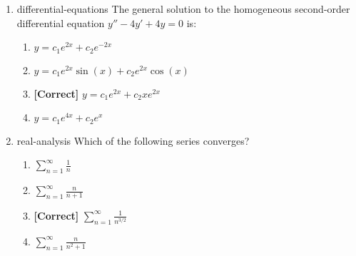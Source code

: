 \documentclass{article}
\newenvironment{problem}{\item}{}
\newcommand{\choice}{\item}
\newcommand{\correctchoice}{\item \textbf{[Correct] }}
\newcommand{\tags}[1]{#1} %
\begin{document}
\begin{enumerate}
        \begin{problem}
            \tags{differential-equations}
            The general solution to the homogeneous second-order differential equation $y'' - 4y' + 4y = 0$ is:
            \begin{enumerate}
                \choice $y = c_1e^{2x} + c_2e^{-2x}$
                \choice $y = c_1e^{2x}\sin(x) + c_2e^{2x}\cos(x)$
                \correctchoice $y = c_1e^{2x} + c_2xe^{2x}$
                \choice $y = c_1e^{4x} + c_2e^x$
            \end{enumerate}
        \end{problem}

        \begin{problem}
            \tags{real-analysis}
            Which of the following series converges?
            \begin{enumerate}
                \choice $\sum_{n=1}^{\infty} \frac{1}{n}$
                \choice $\sum_{n=1}^{\infty} \frac{n}{n+1}$
                \correctchoice $\sum_{n=1}^{\infty} \frac{1}{n^{3/2}}$
                \choice $\sum_{n=1}^{\infty} \frac{n}{n^2+1}$
            \end{enumerate}
        \end{problem}

    \end{enumerate}
\end{document}

